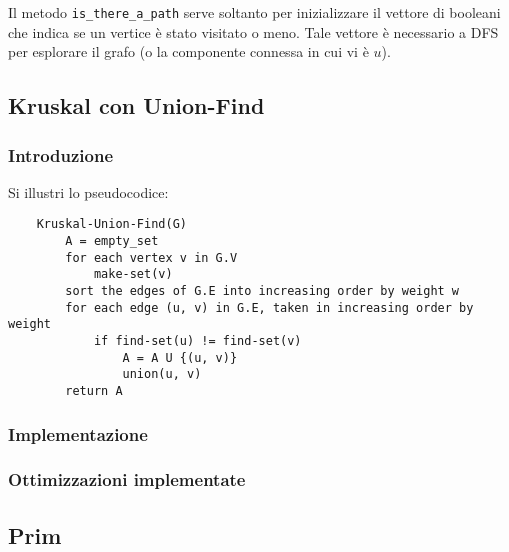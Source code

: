 Il metodo \verb|is_there_a_path| serve soltanto per inizializzare
il vettore di booleani che indica se un vertice è stato visitato o meno.
Tale vettore è necessario a DFS per esplorare il grafo (o la
componente connessa in cui vi è $u$).

\subsection{Kruskal con Union-Find}

\subsubsection{Introduzione}

Si illustri lo pseudocodice:
\begin{verbatim}
    Kruskal-Union-Find(G)
        A = empty_set
        for each vertex v in G.V
            make-set(v)
        sort the edges of G.E into increasing order by weight w
        for each edge (u, v) in G.E, taken in increasing order by weight
            if find-set(u) != find-set(v)
                A = A U {(u, v)}
                union(u, v)
        return A
\end{verbatim}

\subsubsection{Implementazione}

\subsubsection{Ottimizzazioni implementate}

\subsection{Prim}